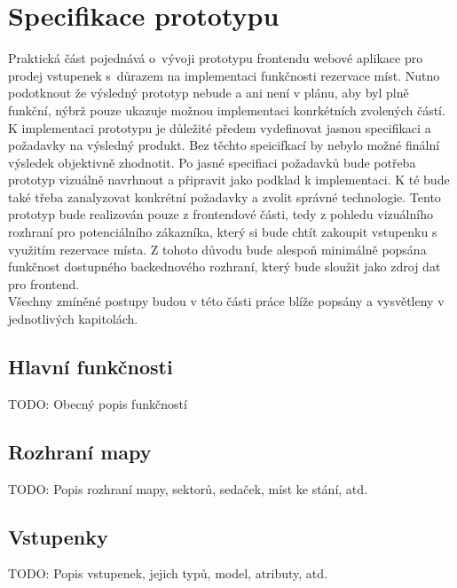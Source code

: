 \chapter{Specifikace prototypu}
\label{chap:specifikace}

Praktická část pojednává o~vývoji prototypu frontendu webové aplikace pro prodej vstupenek s~důrazem na implementaci funkčnosti rezervace míst. Nutno podotknout že výsledný prototyp nebude a ani není v plánu, aby byl plně funkční, nýbrž pouze ukazuje možnou implementaci konrkétních zvolených částí.\\

K implementaci prototypu je důležité předem vydefinovat jasnou specifikaci a požadavky na výsledný produkt. Bez těchto speicifkací by nebylo možné finální výsledek objektivně zhodnotit. Po jasné specifiaci požadavků bude potřeba prototyp vizuálně navrhnout a připravit jako podklad k implementaci. K té bude také třeba zanalyzovat konkrétní požadavky a zvolit správné technologie. Tento prototyp bude realizován pouze z frontendové části, tedy z pohledu vizuálního rozhraní pro potenciálního zákazníka, který si bude chtít zakoupit vstupenku s využitím rezervace místa. Z tohoto důvodu bude alespoň minimálně popsána funkčnost dostupného backednového rozhraní, který bude sloužit jako zdroj dat pro frontend.\\

Všechny zmíněné postupy budou v této části práce blíže popsány a vysvětleny v jednotlivých kapitolách.

\section{Hlavní funkčnosti}
\label{sec:hlavni-funkcnosti}
TODO: Obecný popis funkčností

\section{Rozhraní mapy}
\label{sec:sepcifikace-mapa}
TODO: Popis rozhraní mapy, sektorů, sedaček, míst ke stání, atd.

\section{Vstupenky}
\label{sec:specifikace-vstupenky}
TODO: Popis vstupenek, jejich typů, model, atributy, atd.

